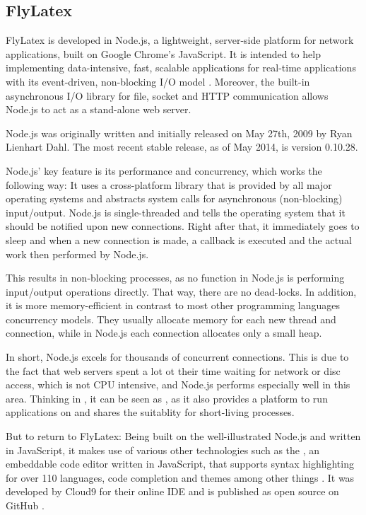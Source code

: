 \subsection{FlyLatex}
\label{subsec:flylatex}
FlyLatex is developed in Node.js, a lightweight, server-side platform for network applications, built on Google Chrome's JavaScript. It is intended to help implementing data-intensive, fast, scalable applications for real-time applications with its event-driven, non-blocking I/O model \cite{website:node-js}. Moreover, the built-in asynchronous I/O library for file, socket and HTTP communication allows Node.js to act as a stand-alone web server.

Node.js was originally written and initially released on May 27th, 2009 by Ryan Lienhart Dahl. The most recent stable release, as of May 2014, is version 0.10.28.

Node.js' key feature is its performance and concurrency, which works the following way: It uses a cross-platform library that is provided by all major operating systems and abstracts system calls for asynchronous (non-blocking) input/output. Node.js is single-threaded and tells the operating system that it should be notified upon new connections. Right after that, it immediately goes to sleep and when a new connection is made, a callback is executed and the actual work then performed by Node.js.

This results in non-blocking processes, as no function in Node.js is performing input/output operations directly. That way, there are no dead-locks. In addition, it is more memory-efficient in contrast to most other programming languages concurrency models. They usually allocate memory for each new thread and connection, while in Node.js each connection allocates only a small heap.

In short, Node.js excels for thousands of concurrent connections. This is due to the fact that web servers spent a lot ot their time waiting for network or disc access, which is not CPU intensive, and Node.js performs especially well in this area. Thinking in , it can be seen as , as it also provides a platform to run applications on and shares the suitablity for short-living processes.

But to return to FlyLatex: Being built on the well-illustrated Node.js and written in JavaScript, it makes use of various other technologies such as the , an embeddable code editor written in JavaScript, that supports syntax highlighting for over 110 languages, code completion and themes among other things \cite{website:ace-editor}. It was developed by Cloud9 for their online IDE and is published as open source on GitHub \cite{website:ace-github}.

